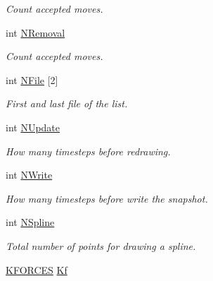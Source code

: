 \begin{DoxyCompactItemize}
\begin{DoxyCompactList}\small\item\em Count accepted moves. \end{DoxyCompactList}\item 
int \hyperlink{classForces_aeeef7711986a24838884d8ef8c12f4ae}{N\+Removal}\hypertarget{classForces_aeeef7711986a24838884d8ef8c12f4ae}{}\label{classForces_aeeef7711986a24838884d8ef8c12f4ae}

\begin{DoxyCompactList}\small\item\em Count accepted moves. \end{DoxyCompactList}\item 
int \hyperlink{classForces_afc36f5ebb0ee5c1be5fc2161e1fa3959}{N\+File} \mbox{[}2\mbox{]}\hypertarget{classForces_afc36f5ebb0ee5c1be5fc2161e1fa3959}{}\label{classForces_afc36f5ebb0ee5c1be5fc2161e1fa3959}

\begin{DoxyCompactList}\small\item\em First and last file of the list. \end{DoxyCompactList}\item 
int \hyperlink{classForces_ab8c3546f48b68bd8fa59174d8a5afa97}{N\+Update}\hypertarget{classForces_ab8c3546f48b68bd8fa59174d8a5afa97}{}\label{classForces_ab8c3546f48b68bd8fa59174d8a5afa97}

\begin{DoxyCompactList}\small\item\em How many timesteps before redrawing. \end{DoxyCompactList}\item 
int \hyperlink{classForces_adcaf21deb47f48c1e25997f52ebd09d6}{N\+Write}\hypertarget{classForces_adcaf21deb47f48c1e25997f52ebd09d6}{}\label{classForces_adcaf21deb47f48c1e25997f52ebd09d6}

\begin{DoxyCompactList}\small\item\em How many timesteps before write the snapshot. \end{DoxyCompactList}\item 
int \hyperlink{classForces_a41019c483f6a39b86e1e25d07b99ee58}{N\+Spline}\hypertarget{classForces_a41019c483f6a39b86e1e25d07b99ee58}{}\label{classForces_a41019c483f6a39b86e1e25d07b99ee58}

\begin{DoxyCompactList}\small\item\em Total number of points for drawing a spline. \end{DoxyCompactList}\item 
\hyperlink{structKFORCES}{K\+F\+O\+R\+C\+ES} \hyperlink{classForces_a774d65ef8685d2859fae66bad8c9b435}{Kf}\hypertarget{classForces_a774d65ef8685d2859fae66bad8c9b435}{}\label{classForces_a774d65ef8685d2859fae66bad8c9b435}


\end{DoxyCompactItemize}
